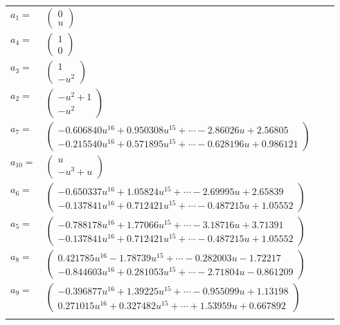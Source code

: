 \documentclass[1p]{elsarticle_modified}
\theoremstyle{definition}
\begin{document}
\begin{tabular}{m{7pt} m{180pt} m{7pt} m{180pt} }
\flushright $a_{1}=$&$\begin{pmatrix}0\\u\end{pmatrix}$ \\
\flushright $a_{4}=$&$\begin{pmatrix}1\\0\end{pmatrix}$ \\
\flushright $a_{3}=$&$\begin{pmatrix}1\\- u^2\end{pmatrix}$ \\
\flushright $a_{2}=$&$\begin{pmatrix}- u^2+1\\- u^2\end{pmatrix}$ \\
\flushright $a_{7}=$&$\begin{pmatrix}-0.606840 u^{16}+0.950308 u^{15}+\cdots-2.86026 u+2.56805\\-0.215540 u^{16}+0.571895 u^{15}+\cdots-0.628196 u+0.986121\end{pmatrix}$ \\
\flushright $a_{10}=$&$\begin{pmatrix}u\\- u^3+u\end{pmatrix}$ \\
\flushright $a_{6}=$&$\begin{pmatrix}-0.650337 u^{16}+1.05824 u^{15}+\cdots-2.69995 u+2.65839\\-0.137841 u^{16}+0.712421 u^{15}+\cdots-0.487215 u+1.05552\end{pmatrix}$ \\
\flushright $a_{5}=$&$\begin{pmatrix}-0.788178 u^{16}+1.77066 u^{15}+\cdots-3.18716 u+3.71391\\-0.137841 u^{16}+0.712421 u^{15}+\cdots-0.487215 u+1.05552\end{pmatrix}$ \\
\flushright $a_{8}=$&$\begin{pmatrix}0.421785 u^{16}-1.78739 u^{15}+\cdots-0.282003 u-1.72217\\-0.844603 u^{16}+0.281053 u^{15}+\cdots-2.71804 u-0.861209\end{pmatrix}$ \\
\flushright $a_{9}=$&$\begin{pmatrix}-0.396877 u^{16}+1.39225 u^{15}+\cdots-0.955099 u+1.13198\\0.271015 u^{16}+0.327482 u^{15}+\cdots+1.53959 u+0.667892\end{pmatrix}$\\&\end{tabular}
\end{document}
